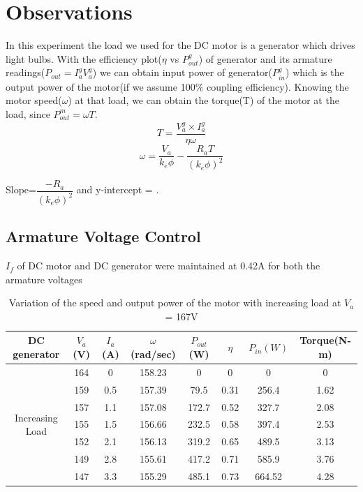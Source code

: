 \documentclass[12pt]{article}
\begin{document}
    \section{Observations}
    In this experiment the load we used for the DC motor is a generator which drives light bulbs. With the efficiency plot($\eta$ vs $P_{out}^g$) of generator and its armature readings($P_{out}=I_a^gV_a^g$) we can obtain input power of generator($P_{in}^g$) which is the output power of the motor(if we assume 100\% coupling efficiency). Knowing the motor speed($\omega$) at that load, we can obtain the torque(T) of the motor at the load, since $P_{out}^m=\omega T$.
    \begin{equation}
        T = \dfrac{V_a^g \times I_a^g}{\eta \omega}
    \end{equation}
    \begin{equation}
        \omega=\dfrac{V_a}{k_e\phi}-\dfrac{R_aT}{(k_e\phi)^2}
    \end{equation}
    
    Slope=$\dfrac{-R_a}{(k_e\phi)^2}$ and y-intercept = .
        \subsection{Armature Voltage Control}
            $I_f$ of DC motor and DC generator were maintained at 0.42A for both the armature voltages
            \begin{table}[H]
                \centering
                \begin{tabular}{|c|c|c|c|c|c|c|c|}
                     \hline
                     \hline
                    DC generator & $V_a$(V) & $I_a$(A) & $\omega$(rad/sec) & $P_{out}$(W) & $\eta$ & $P_{in}(W)$ & Torque(N-m)\\
                    \hline
                    \multirow{8}{5em}{Increasing Load} & 164 & 0 & 158.23 & 0 & 0 & 0 & 0\\
                         & 159 & 0.5 & 157.39 & 79.5 & 0.31 & 256.4 & 1.62 \\
                         & 157 & 1.1 & 157.08 & 172.7 & 0.52 & 327.7 & 2.08 \\
                         & 155 & 1.5 & 156.66 & 232.5 & 0.58 & 397.4 & 2.53\\
                         & 152 & 2.1 & 156.13 & 319.2 & 0.65 & 489.5 & 3.13\\
                         & 149 & 2.8 & 155.61 & 417.2 & 0.71 & 585.9 & 3.76\\
                         & 147 & 3.3 & 155.29 & 485.1 & 0.73 & 664.52 & 4.28\\
                         \hline
                         \hline
                \end{tabular}
                \caption{Variation of the speed and output power of the motor with increasing load at $V_a$ = 167V}
                \label{tab:my_label}
            \end{table}
                
\end{document}
